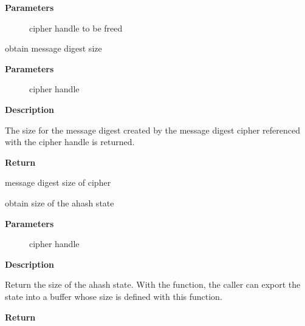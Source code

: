 \documentclass[a4paper,8pt,english]{sphinxmanual}
\begin{document}
\textbf{Parameters}
\begin{description}
\item[{}] \leavevmode
cipher handle to be freed

\end{description}

\begin{fulllineitems}
\label{crypto/api-digest:c.crypto_ahash_digestsize}
obtain message digest size

\end{fulllineitems}


\textbf{Parameters}
\begin{description}
\item[{}] \leavevmode
cipher handle

\end{description}

\textbf{Description}

The size for the message digest created by the message digest cipher
referenced with the cipher handle is returned.

\textbf{Return}

message digest size of cipher

\begin{fulllineitems}
\label{crypto/api-digest:c.crypto_ahash_statesize}
obtain size of the ahash state

\end{fulllineitems}


\textbf{Parameters}
\begin{description}
\item[{}] \leavevmode
cipher handle

\end{description}

\textbf{Description}

Return the size of the ahash state. With the {\hyperref[crypto/api\string-digest:c.crypto_ahash_export]{\emph{}}}
function, the caller can export the state into a buffer whose size is
defined with this function.

\textbf{Return}
\end{document}
